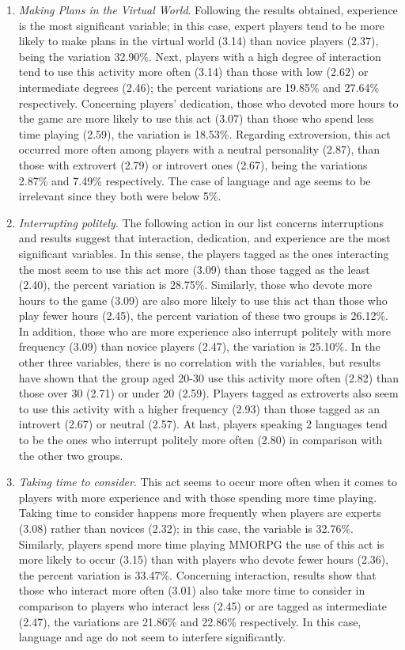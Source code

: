 \documentclass[english]{textolivre}
\begin{document}
\begin{enumerate}
\item \emph{Making Plans in the Virtual World}. Following the results obtained, experience is the most significant variable; in this case, expert players tend to be more likely to make plans in the virtual world (3.14) than novice players (2.37), being the variation 32.90\%. Next, players with a high degree of interaction tend to use this activity more often (3.14) than those with low (2.62) or intermediate degrees (2.46); the percent variations are 19.85\% and 27.64\% respectively. Concerning players' dedication, those who devoted more hours to the game are more likely to use this act (3.07) than those who spend less time playing (2.59), the variation is 18.53\%. Regarding extroversion, this act occurred more often among players with a neutral personality (2.87), than those with extrovert (2.79) or introvert ones (2.67), being the variations 2.87\% and 7.49\% respectively. The case of language and age seems to be irrelevant since they both were below 5\%. 
\item \emph{Interrupting politely}. The following action in our list concerns interruptions and results suggest that interaction, dedication, and experience are the most significant variables. In this sense, the players tagged as the ones interacting the most seem to use this act more (3.09) than those tagged as the least (2.40), the percent variation is 28.75\%. Similarly, those who devote more hours to the game (3.09) are also more likely to use this act than those who play fewer hours (2.45), the percent variation of these two groups is 26.12\%. In addition, those who are more experience also interrupt politely with more frequency (3.09) than novice players (2.47), the variation is 25.10\%. In the other three variables, there is no correlation with the variables, but results have shown that the group aged 20-30 use this activity more often (2.82) than those over 30 (2.71) or under 20 (2.59). Players tagged as extroverts also seem to use this activity with a higher frequency (2.93) than those tagged as an introvert (2.67) or neutral (2.57). At last, players speaking 2 languages tend to be the ones who interrupt politely more often (2.80) in comparison with the other two groups. 
\item \emph{Taking time to consider}. This act seems to occur more often when it comes to players with more experience and with those spending more time playing. Taking time to consider happens more frequently when players are experts (3.08) rather than novices (2.32); in this case, the variable is 32.76\%. Similarly, players spend more time playing MMORPG the use of this act is more likely to occur (3.15) than with players who devote fewer hours (2.36), the percent variation is 33.47\%. Concerning interaction, results show that those who interact more often (3.01) also take more time to consider in comparison to players who interact less (2.45) or are tagged as intermediate (2.47), the variations are 21.86\% and 22.86\% respectively. In this case, language and age do not seem to interfere significantly. 

\end{enumerate}
\end{document}
